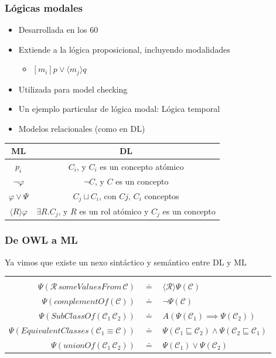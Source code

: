 \documentclass[compress,xcolor=dvipsnames]{beamer}
\theoremstyle{definition}
\begin{document}
\begin{frame}
	\frametitle{Lógicas modales}
	\begin{itemize}[<+->]
		\item Desarrollada en los 60
		\item Extiende a la lógica proposicional, incluyendo modalidades
		\begin{itemize}[<+->]
			 \item $[m_{i}] p  \lor \langle m_{j} \rangle q$
		\end{itemize}
	\item Utilizada para model checking
	\item Un ejemplo particular de lógica modal: Lógica temporal
	\item Modelos relacionales (como en DL)
	\end{itemize}
	\onslide<+->
	\begin{center}
		\begin{tabular}{ c |  c }
			ML & DL \\ \hline
			$p_{i}$ & $C_{i}$, y $C_{i}$ es un concepto atómico \\ \hline
			$\neg \varphi$ & $\neg C$, y $C$ es un concepto		\\ \hline
			$\varphi \lor \Psi $ &	$C_{j}\sqcup C_{i}$, con $Cj,\,C_{i}$ conceptos		\\ \hline
			$\langle R \rangle \varphi$  &   $\exists R.C_{j}$, y $R$ es un rol atómico y $C_{j}$ es un concepto		\\ \hline
		\end{tabular}
	\end{center}
	
\end{frame}


\begin{frame}[<-+>]
	\frametitle{De OWL a ML}
	Ya vimos que existe un nexo sintáctico y semántico entre DL y ML
	\pause
	
	
	\begin{tabular}{r  c  l}
	& & \\
	$\Psi(\mathcal{R}\,someValuesFrom\,\mathcal{C})$ & $\doteq$ & $\langle\mathcal{R}\rangle\Psi(\mathcal{C})$ \\
	$\Psi(complementOf(\mathcal{C}))$ & $\doteq$ & \textbf{\large{}$\neg\Psi(\mathcal{C})$} \\
	$\Psi(SubClassOf(\mathcal{C}_{1}\,\mathcal{C}_{2}))$ & $\doteq$ & $A(\Psi(\mathcal{C}_{1})\implies\Psi(\mathcal{C}_{2}))$ \\
	$\Psi(EquivalentClasses(\mathcal{C}_{1}\equiv\mathcal{C}))$ & $\doteq$ & $\Psi(\mathcal{C}_{1}\sqsubseteq\mathcal{C}_{2})\land\Psi(\mathcal{C}_{2}\sqsubseteq\mathcal{C}_{1})$ \\
	$\Psi(unionOf(\mathcal{C}_{1}\,\mathcal{C}_{2}))$ & $\doteq$ & $\Psi(\mathcal{C}_{1})\lor\Psi(\mathcal{C}_{2})$ \\
\end{tabular}
\end{frame}
\end{document}
